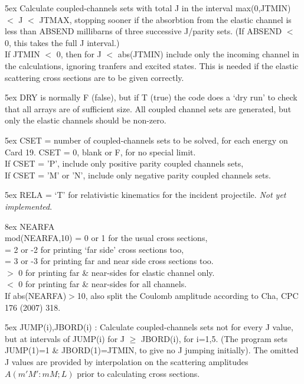 \documentclass[11pt]{article}
\begin{document}
\hangindent 5ex
Calculate coupled-channels sets with total J in the interval
max(0,JTMIN) $<$  J  $<$ JTMAX,
stopping sooner if the absorbtion from the elastic channel
is less than ABSEND millibarns of three successive J/parity sets.
(If ABSEND $<$ 0, this takes the full J interval.)
\\
If JTMIN $<$ 0, then for J $<$ abs(JTMIN) include only the incoming channel
in the calculations, ignoring tranfers and excited states.
This is needed if the elastic scattering cross sections are to be given
correctly.

\hangindent 5ex
DRY is normally F (false), but if T (true) the code does a `dry run'
to check that all arrays are of sufficient size.
All coupled channel sets are generated, but only the elastic
channels should be non-zero.

\hangindent 5ex
CSET = number of coupled-channels sets to be solved, for each energy
on Card 19.  CSET = 0, blank or F, for no special limit.\\
If CSET = 'P', include only positive parity coupled channels sets,\\
If CSET = 'M' or 'N', include only negative parity coupled channels sets.

\hangindent 5ex
RELA = `T' for relativistic kinematics for the incident projectile.
{\em Not yet implemented}.

\hangindent 8ex  NEARFA
\\  mod(NEARFA,10) = 0 or 1 for the usual cross sections,
\\  = 2 or -2 for printing `far side' cross sections too,
\\  = 3 or -3 for printing far and near side cross sections too.
\\  $>$ 0 for printing far \& near-sides for elastic channel only.
\\  $<$ 0 for printing far \& near-sides for all channels.\\
If abs(NEARFA)$>$10, also split the Coulomb amplitude according to Cha, CPC 176 (2007) 318.



\hangindent 5ex
JUMP(i),JBORD(i) : Calculate coupled-channels sets not for every J
value, but at intervals of JUMP(i) for J $\geq$ JBORD(i), for i=1,5.
(The program sets JUMP(1)=1 \& JBORD(1)=JTMIN, to give no J jumping initially).
The omitted J values are provided by interpolation on the scattering
amplitudes $A(m'M':mM; L)$ prior to calculating cross sections.
\end{document}
